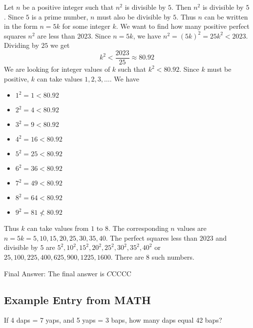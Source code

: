 \begin{paracol}{2}
\switchcolumn
\begin{tcolorbox}[breakable, colframe=red!70, colback=red!10, title=Incorrect Response]
Let $n$ be a positive integer such that $n^2$ is divisible by $5$.
Then $n^2$ is divisible by $5$. Since $5$ is a prime number, $n$ must also be divisible by $5$.
Thus $n$ can be written in the form $n = 5k$ for some integer $k$.
We want to find how many positive perfect squares $n^2$ are less than $2023$.
Since $n = 5k$, we have $n^2 = (5k)^2 = 25k^2 < 2023$.
Dividing by $25$ we get
$$k^2 < \frac{2023}{25} \approx 80.92$$
We are looking for integer values of $k$ such that $k^2 < 80.92$.
Since $k$ must be positive, $k$ can take values $1, 2, 3, \dots$. We have
\begin{itemize}
    \item $1^2 = 1 < 80.92$
    \item $2^2 = 4 < 80.92$
    \item $3^2 = 9 < 80.92$
    \item $4^2 = 16 < 80.92$
    \item $5^2 = 25 < 80.92$
    \item $6^2 = 36 < 80.92$
    \item $7^2 = 49 < 80.92$
    \item $8^2 = 64 < 80.92$
    \item $9^2 = 81 \nless 80.92$
\end{itemize}
Thus $k$ can take values from $1$ to $8$. The corresponding $n$ values are $n = 5k = 5, 10, 15, 20, 25, 30, 35, 40$. The perfect squares less than $2023$ and divisible by $5$ are $5^2, 10^2, 15^2, 20^2, 25^2, 30^2, 35^2, 40^2$ or $25, 100, 225, 400, 625, 900, 1225, 1600$.
There are $8$ such numbers.

Final Answer: The final answer is $\boxed{C}$CCCC
\end{tcolorbox}

\end{paracol}


\subsection{Example Entry from MATH}
\vspace{0.4cm}
\begin{tcolorbox}[title=Question, breakable]
If 4 daps = 7 yaps, and 5 yaps = 3 baps, how many daps equal 42 baps?
\end{tcolorbox}



